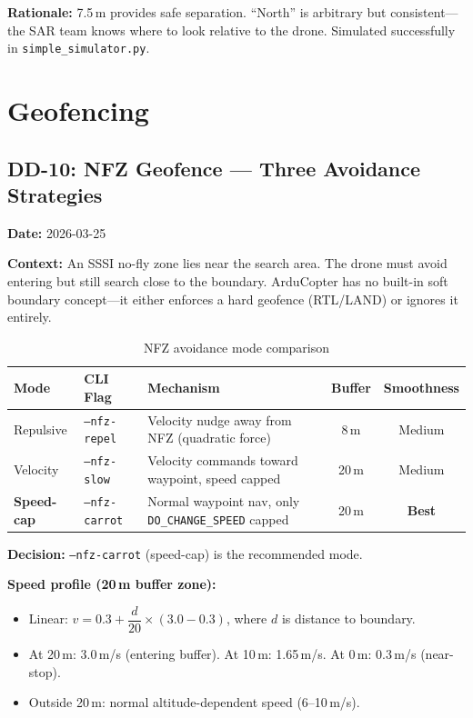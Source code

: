 \documentclass[10pt,a4paper]{article}
\newcommand{\compactTable}{\small\setlength{\tabcolsep}{3pt}\renewcommand{\arraystretch}{1.05}}
\newcommand{\ddlabel}[1]{\textbf{\color{headblue}#1}\hspace{0.5em}}
\begin{document}
\ddlabel{Rationale:} 7.5\,m provides safe separation. ``North'' is arbitrary but consistent---the SAR team knows where to look relative to the drone. Simulated successfully in \texttt{simple\_simulator.py}.

\section{Geofencing}

\subsection{DD-10: NFZ Geofence --- Three Avoidance Strategies}
\label{sec:dd10}

\ddlabel{Date:} 2026-03-25

\ddlabel{Context:} An SSSI no-fly zone lies near the search area. The drone must avoid entering but still search close to the boundary. ArduCopter has no built-in soft boundary concept---it either enforces a hard geofence (RTL/LAND) or ignores it entirely.

\vspace{4pt}

\begin{table}[H]
\centering
\compactTable
\caption{NFZ avoidance mode comparison}
\label{tab:dd10-modes}
\begin{tabularx}{\textwidth}{l l X c c}
\toprule
\textbf{Mode} & \textbf{CLI Flag} & \textbf{Mechanism} & \textbf{Buffer} & \textbf{Smoothness} \\
\midrule
Repulsive & \texttt{--nfz-repel} & Velocity nudge away from NFZ (quadratic force) & 8\,m & Medium \\
Velocity & \texttt{--nfz-slow} & Velocity commands toward waypoint, speed capped & 20\,m & Medium \\
\textbf{Speed-cap} & \texttt{--nfz-carrot} & Normal waypoint nav, only \texttt{DO\_CHANGE\_SPEED} capped & 20\,m & \textbf{Best} \\
\bottomrule
\end{tabularx}
\end{table}

\begin{decisionbox}
\textbf{Decision:} \texttt{--nfz-carrot} (speed-cap) is the recommended mode.
\end{decisionbox}

\ddlabel{Speed profile (20\,m buffer zone):}
\begin{itemize}
  \item Linear: $v = 0.3 + \dfrac{d}{20} \times (3.0 - 0.3)$, where $d$ is distance to boundary.
  \item At 20\,m: 3.0\,m/s (entering buffer). At 10\,m: 1.65\,m/s. At 0\,m: 0.3\,m/s (near-stop).
  \item Outside 20\,m: normal altitude-dependent speed (6--10\,m/s).
\end{itemize}
\end{document}
